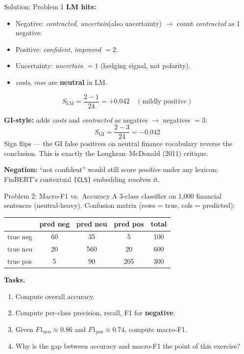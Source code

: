 \documentclass[9pt,t]{beamer}
\begin{document}
\begin{frame}{Solution: Problem 1}
\textbf{LM hits:}
\begin{itemize}\small
  \item Negative: \emph{contracted}, \emph{uncertain}(also uncertainty) $\to$ count
        \emph{contracted} as 1 negative.
  \item Positive: \emph{confident}, \emph{improved} $=2$.
  \item Uncertainty: \emph{uncertain} $=1$ (hedging signal, not polarity).
  \item \emph{costs}, \emph{rose} are \textbf{neutral} in LM.
\end{itemize}
\[
S_{\text{LM}}=\frac{2-1}{24}=+0.042 \quad(\text{mildly positive})
\]

\medskip
\textbf{GI-style:} adds \emph{costs} and \emph{contracted} as negative $\to$
negatives $=3$:
\[
S_{\text{GI}}=\frac{2-3}{24}=-0.042
\]
\alert{Sign flips} --- the GI false positives on neutral finance vocabulary reverse
the conclusion. This is exactly the Loughran--McDonald (2011) critique.

\medskip
\textbf{Negation:} ``not confident'' would still score \emph{positive} under any
lexicon; FinBERT's contextual \texttt{[CLS]} embedding resolves it.
\end{frame}

\begin{frame}{Problem 2: Macro-F1 vs.\ Accuracy}
A 3-class classifier on 1{,}000 financial sentences (neutral-heavy). Confusion
matrix (rows = true, cols = predicted):

\medskip
\begin{center}
\begin{tabular}{l|ccc|c}
\toprule
 & pred neg & pred neu & pred pos & total \\
\midrule
true neg & 60 & 35 & 5  & 100 \\
true neu & 20 & 560 & 20 & 600 \\
true pos & 5  & 90 & 205 & 300 \\
\bottomrule
\end{tabular}
\end{center}

\medskip
\textbf{Tasks.}
\begin{enumerate}
  \item Compute overall accuracy.
  \item Compute per-class precision, recall, F1 for \textbf{negative}.
  \item Given $F1_{\text{neu}}\approx 0.86$ and $F1_{\text{pos}}\approx 0.74$,
        compute macro-F1.
  \item Why is the gap between accuracy and macro-F1 the point of this exercise?
\end{enumerate}
\end{frame}
\end{document}

